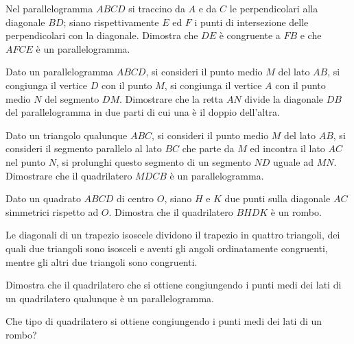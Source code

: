 \begin{multicols}{2}
\begin{esercizio}
\label{ese:4.44}
Nel parallelogramma $ABCD$ si traccino da $A$ e da $C$ le 
perpendicolari alla diagonale $BD$; siano rispettivamente $E$ ed $F$ 
i punti di intersezione delle perpendicolari con la diagonale. 
Dimostra che $DE$ è congruente a $FB$ e che $AFCE$ è un 
parallelogramma.
\end{esercizio}

\begin{esercizio}
\label{ese:4.45}
Dato un parallelogramma $ABCD$, si consideri il punto medio $M$ del 
lato $AB$, si congiunga il vertice $D$ con il punto $M$, si congiunga 
il vertice $A$ con il punto medio $N$ del segmento $DM$. Dimostrare 
che la retta $AN$ divide la diagonale $DB$ del parallelogramma in due 
parti di cui una è il doppio dell'altra.	
\end{esercizio}

\begin{esercizio}
\label{ese:4.46}
Dato un triangolo qualunque $ABC$, si consideri il punto medio $M$ 
del lato $AB$, si consideri il segmento parallelo al lato $BC$ che 
parte da $M$ ed incontra il lato $AC$ nel punto $N$, si prolunghi 
questo segmento di un segmento $ND$ uguale ad $MN$. Dimostrare che il 
quadrilatero $MDCB$ è un parallelogramma.
\end{esercizio}

\begin{esercizio}
\label{ese:4.47}
Dato un quadrato $ABCD$ di centro $O$, siano $H$ e $K$ due punti 
sulla diagonale $AC$ simmetrici rispetto ad $O$. Dimostra che il 
quadrilatero $BHDK$ è un rombo.
\end{esercizio}

\begin{esercizio}
\label{ese:4.48}
Le diagonali di un trapezio isoscele dividono il trapezio in quattro 
triangoli, dei quali due triangoli sono isosceli e aventi gli angoli 
ordinatamente congruenti, mentre gli altri due triangoli sono 
congruenti.
\end{esercizio}

\begin{esercizio}
\label{ese:4.49}
Dimostra che il quadrilatero che si ottiene congiungendo i punti medi 
dei lati di un quadrilatero qualunque è un parallelogramma.
\end{esercizio}

\begin{esercizio}
\label{ese:4.50}
Che tipo di quadrilatero si ottiene congiungendo i punti medi dei 
lati di un rombo?
\end{esercizio}


\end{multicols}
